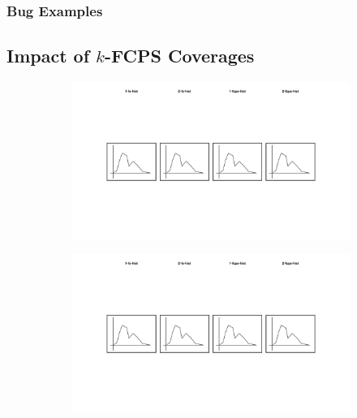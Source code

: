 \subsubsection{Bug Examples}\label{sec:k-fs-example}

\todo


\subsection{Impact of $k$-FCPS Coverages}\label{sec:impact-k-fcps}

\begin{figure}
  \centering
  \begin{subfigure}{0.24\textwidth}
    \centering
    \includegraphics[width=\textwidth]{img/1-fs-hist}
  \end{subfigure}
  \begin{subfigure}{0.24\textwidth}
    \centering
    \includegraphics[width=\textwidth]{img/2-fs-hist}

\end{subfigure}
\end{figure}
